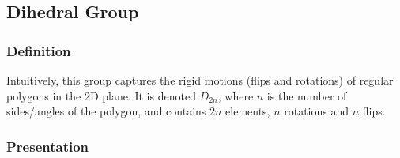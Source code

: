 \subsection{Dihedral Group}\label{dihedralgroup}

\subsubsection{Definition}

Intuitively, this group captures the rigid motions (flips and rotations) of regular polygons in the $2$D plane. It is denoted
$D_{2n}$, where $n$ is the number of sides/angles of the polygon, and contains $2n$ elements, $n$ rotations and $n$ flips.

\subsubsection{Presentation}